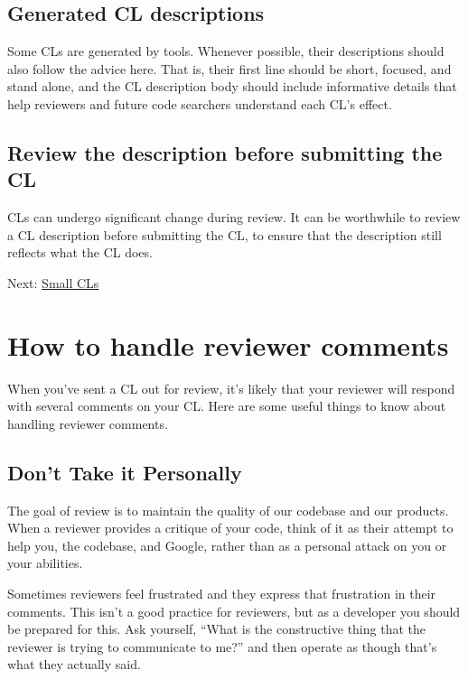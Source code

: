 \documentclass[
]{article}
\begin{document}
\subsection{Generated CL descriptions}\label{generated-cl-descriptions}

Some CLs are generated by tools. Whenever possible, their descriptions
should also follow the advice here. That is, their first line should be
short, focused, and stand alone, and the CL description body should
include informative details that help reviewers and future code
searchers understand each CL's effect.

\subsection{Review the description before submitting the
CL}\label{review-the-description-before-submitting-the-cl}

CLs can undergo significant change during review. It can be worthwhile
to review a CL description before submitting the CL, to ensure that the
description still reflects what the CL does.

Next: \href{small-cls.md}{Small CLs}

\section{How to handle reviewer
comments}\label{how-to-handle-reviewer-comments}

When you've sent a CL out for review, it's likely that your reviewer
will respond with several comments on your CL. Here are some useful
things to know about handling reviewer comments.

\subsection{Don't Take it Personally}\label{personal}

The goal of review is to maintain the quality of our codebase and our
products. When a reviewer provides a critique of your code, think of it
as their attempt to help you, the codebase, and Google, rather than as a
personal attack on you or your abilities.

Sometimes reviewers feel frustrated and they express that frustration in
their comments. This isn't a good practice for reviewers, but as a
developer you should be prepared for this. Ask yourself, ``What is the
constructive thing that the reviewer is trying to communicate to me?''
and then operate as though that's what they actually said.
\end{document}
